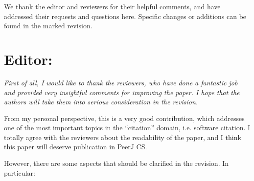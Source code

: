 \documentclass{article}
\newcommand{\hly}[1]{{\sethlcolor{yellow}\hl{#1}}}
\newcommand{\hlb}[1]{{\sethlcolor{SkyBlue}\hl{#1}}}
\newcommand{\hlg}[1]{{\sethlcolor{green}\hl{#1}}}
\begin{document}
We thank the editor and reviewers for their helpful comments, and have addressed their requests and questions here.
Specific changes or additions can be found in the marked revision.


\section*{Editor:}

{\itshape
First of all, I would like to thank the reviewers, who have done a fantastic job and provided very insightful comments for improving the paper. I hope that the authors will take them into serious consideration in the revision.

From my personal perspective, this is a very good contribution, which addresses one of the most important topics in the ``citation'' domain, i.e. software citation. I totally agree with the reviewers about the readability of the paper, and I think this paper will deserve publication in PeerJ CS.

However, there are some aspects that should be clarified in the revision. In particular:
}
\end{document}
